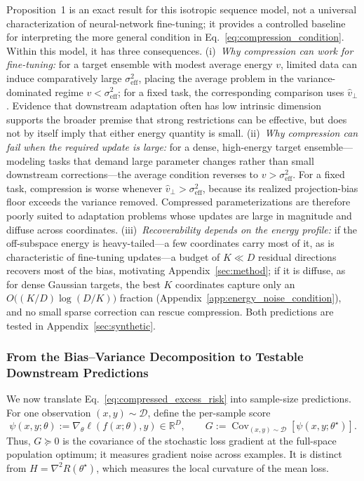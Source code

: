 Proposition~1 is an exact result for this isotropic sequence model, not a universal characterization of neural-network fine-tuning; it provides a controlled baseline for interpreting the more general condition in Eq.~\eqref{eq:compression_condition}.
Within this model, it has three consequences.
(i)~\emph{Why compression can work for fine-tuning:} for a target ensemble with modest average energy $v$, limited data can induce comparatively large $\sigma_{\mathrm{eff}}^2$, placing the average problem in the variance-dominated regime $v<\sigma_{\mathrm{eff}}^2$; for a fixed task, the corresponding comparison uses $\hat v_\perp$. Evidence that downstream adaptation often has low intrinsic dimension \citep{aghajanyan2021intrinsic} supports the broader premise that strong restrictions can be effective, but does not by itself imply that either energy quantity is small.
(ii)~\emph{Why compression can fail when the required update is large:} for a dense, high-energy target ensemble---modeling tasks that demand large parameter changes rather than small downstream corrections---the average condition reverses to $v>\sigma_{\mathrm{eff}}^2$. For a fixed task, compression is worse whenever $\hat v_\perp>\sigma_{\mathrm{eff}}^2$, because its realized projection-bias floor exceeds the variance removed. Compressed parameterizations are therefore poorly suited to adaptation problems whose updates are large in magnitude and diffuse across coordinates.
(iii)~\emph{Recoverability depends on the energy profile:} if the off-subspace energy is heavy-tailed---a few coordinates carry most of it, as is characteristic of fine-tuning updates---a budget of $K\ll D$ residual directions recovers most of the bias, motivating Appendix~\ref{sec:method}; if it is diffuse, as for dense Gaussian targets, the best $K$ coordinates capture only an $O\!\big((K/D)\log(D/K)\big)$ fraction (Appendix~\ref{app:energy_noise_condition}), and no small sparse correction can rescue compression.
Both predictions are tested in Appendix~\ref{sec:synthetic}.

\subsubsection{From the Bias--Variance Decomposition to Testable Downstream Predictions}
\label{sec:testable_predictions}

We now translate Eq.~\eqref{eq:compressed_excess_risk} into sample-size predictions.
For one observation $(x,y)\sim\mathcal D$, define the per-sample score
\begin{equation}
\psi(x,y;\theta)
:=
\nabla_\theta \ell(f(x;\theta),y)
\in\mathbb R^D,
\qquad
G
:=
\operatorname{Cov}_{(x,y)\sim\mathcal D}
\!\left[\psi(x,y;\theta^\star)\right].
\label{eq:score_covariance}
\end{equation}
Thus, $G\succeq0$ is the covariance of the stochastic loss gradient at the full-space population optimum; it measures gradient noise across examples.
It is distinct from $H=\nabla^2R(\theta^\star)$, which measures the local curvature of the mean loss.

